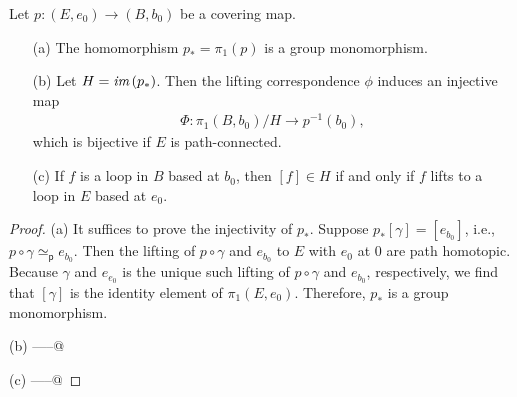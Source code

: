 \begin{thm}
    Let $p: (E, e_0)\rightarrow (B, b_0)$ be a covering map.
    \begin{enumerate}
        \item[(a)]
        {
            The homomorphism $p_*=\pi_1(p)$ is a group monomorphism.
        }
        \item[(b)]
        {
            Let $H=\textit{im\,}(p_*)$.
            Then the lifting correspondence $\phi$ induces an injective map
            \begin{align*}
                \Phi: \pi_1(B, b_0)/H \rightarrow p^{-1}(b_0),
            \end{align*}
            which is bijective if $E$ is path-connected.
        }
        \item[(c)]
        {
            If $f$ is a loop in $B$ based at $b_0$, then $[f]\in H$ if and only if $f$ lifts to a loop in $E$ based at $e_0$.
        }
    \end{enumerate}
\end{thm}
\begin{proof}
    \hangindent=0.65cm
    \noindent(a)
    It suffices to prove the injectivity of $p_*$.
    Suppose $p_*[\gamma]=[e_{b_0}]$, i.e., $p\circ\gamma\simeq_\textsf{p} e_{b_0}$.
    Then the lifting of $p\circ\gamma$ and $e_{b_0}$ to $E$ with $e_0$ at 0 are path homotopic.
    Because $\gamma$ and $e_{e_0}$ is the unique such lifting of $p\circ\gamma$ and $e_{b_0}$, respectively, we find that $[\gamma]$ is the identity element of $\pi_1(E, e_0)$.
    Therefore, $p_*$ is a group monomorphism.

    \noindent(b)
    -----@

    \noindent(c)
    -----@
\end{proof}
